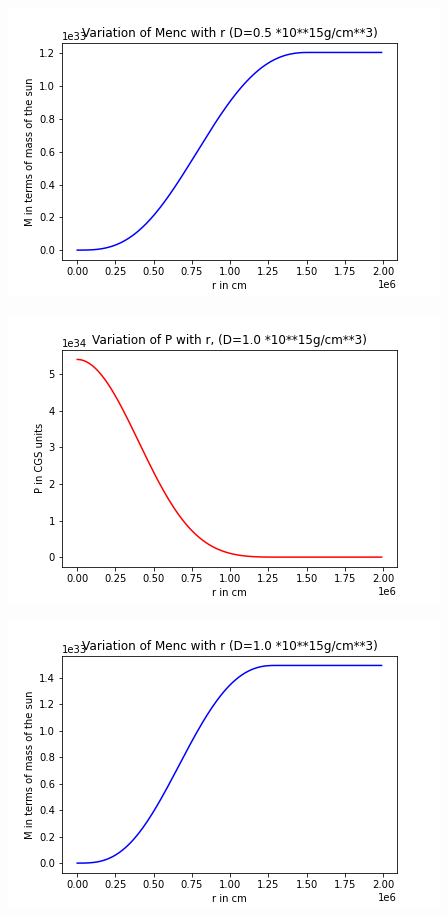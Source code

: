 \documentclass{article}
\begin{document}
\begin{center}
\begin{multicols}{2}
\begin{center}
        \end{center}
\columnbreak
       \includegraphics[scale=0.3]{Images/Mr_pb2_1}
\end{multicols}
\begin{multicols}{2}
	\begin{center}
        \includegraphics[scale=0.3]{Images/Pr_pb2_2}
        \end{center}
\columnbreak
       \includegraphics[scale=0.3]{Images/Mr_pb2_2}

\end{multicols}
\end{center}
\end{document}
